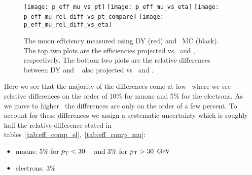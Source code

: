 \begin{figure}[!hbt]
\begin{center}
\texttt{[image: p\_eff\_mu\_vs\_pt]}
\texttt{[image: p\_eff\_mu\_vs\_eta]}
\texttt{[image: p\_eff\_mu\_rel\_diff\_vs\_pt\_compare]}
\texttt{[image: p\_eff\_mu\_rel\_diff\_vs\_eta]}
\caption[The muon efficiency measured vs \pt~and \aeta]
{\label{fig:eff_comp_mu}
The muon efficiency measured using DY (red) and \ttbar~MC (black). The top two
plots are the efficiencies projected vs \pt~and \aeta, respectively. The bottom
two plots are the relative differences between DY and \ttbar~ also projected vs
\pt~and \aeta.
}
\end{center}
\end{figure}
 
Here we see that the majority of the differences come at low \pt~where we
see relative differences on the order of 10\% for muons and 5\% for the
electrons. As we move to higher \pt~the differences are only on the order
of a few percent. To account for these differences we assign a systematic
uncertainty which is roughly half the relative difference stated in
tables~\ref{tab:eff_comp_el},~\ref{tab:eff_comp_mu}:
\begin{itemize}
  \item muons: 5\% for $p_{\mathrm{T}} < 30\ $\GeV~ and 3\% for $p_{\mathrm{T}} > 30\ \,\text{Ge\hspace{-.08em}V}$
  \item electrons: 3\%
\end{itemize}

